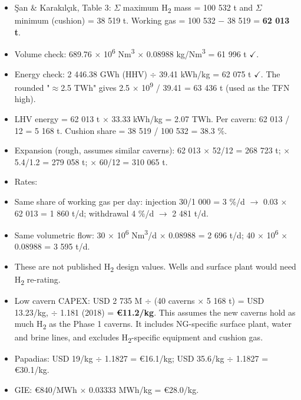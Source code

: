 \documentclass[11pt,a4paper]{article}
\begin{document}
\begin{itemize}\setlength\itemsep{1pt}

  \item Şan \& Karakılçık, Table 3: $\Sigma$ maximum H\textsubscript{2} mass = 100 532 t and $\Sigma$ minimum (cushion) = 38 519 t. Working gas = 100 532 $-$ 38 519 = \textbf{62 013 t}.

  \item Volume check: 689.76 $\times$ 10\textsuperscript{6} Nm\textsuperscript{3} $\times$ 0.08988 kg/Nm\textsuperscript{3} = 61 996 t $\checkmark$.

  \item Energy check: 2 446.38 GWh (HHV) $\div$ 39.41 kWh/kg = 62 075 t $\checkmark$. The rounded "$\approx$2.5 TWh" gives 2.5 $\times$ 10\textsuperscript{9} / 39.41 = 63 436 t (used as the TFN high).

  \item LHV energy = 62 013 t $\times$ 33.33 kWh/kg = 2.07 TWh. Per cavern: 62 013 / 12 = 5 168 t. Cushion share = 38 519 / 100 532 = 38.3 \%.

  \item Expansion (rough, assumes similar caverns): 62 013 $\times$ 52/12 = 268 723 t; $\times$ 5.4/1.2 = 279 058 t; $\times$ 60/12 = 310 065 t.

  \item Rates:

  \item Same share of working gas per day: injection 30/1 000 = 3 \%/d $\rightarrow$ 0.03 $\times$ 62 013 = 1 860 t/d; withdrawal 4 \%/d $\rightarrow$ 2 481 t/d.

  \item Same volumetric flow: 30 $\times$ 10\textsuperscript{6} Nm\textsuperscript{3}/d $\times$ 0.08988 = 2 696 t/d; 40 $\times$ 10\textsuperscript{6} $\times$ 0.08988 = 3 595 t/d.

  \item These are not published H\textsubscript{2} design values. Wells and surface plant would need H\textsubscript{2} re-rating.

  \item Low cavern CAPEX: USD 2 735 M $\div$ (40 caverns $\times$ 5 168 t) = USD 13.23/kg, $\div$ 1.181 (2018) = \textbf{\euro{}11.2/kg}. This assumes the new caverns hold as much H\textsubscript{2} as the Phase 1 caverns. It includes NG-specific surface plant, water and brine lines, and excludes H\textsubscript{2}-specific equipment and cushion gas.

  \item Papadias: USD 19/kg $\div$ 1.1827 = \euro{}16.1/kg; USD 35.6/kg $\div$ 1.1827 = \euro{}30.1/kg.

  \item GIE: \euro{}840/MWh $\times$ 0.03333 MWh/kg = \euro{}28.0/kg.

\end{itemize}
\end{document}
